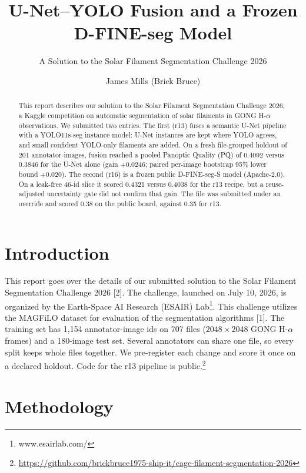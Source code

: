 \documentclass[sigconf,nonacm]{acmart}
\title{U-Net--YOLO Fusion and a Frozen D-FINE-seg Model}
\subtitle{A Solution to the Solar Filament Segmentation Challenge 2026}
\author{James Mills (Brick Bruce)}
\affiliation{%
  \institution{CAGE / Innovative Creative Solutions}
  \city{Port Allen}
  \state{Louisiana}
  \country{United States}
}
\begin{document}
\begin{abstract}
This report describes our solution to the Solar Filament Segmentation Challenge 2026, a Kaggle competition on automatic segmentation of solar filaments in GONG H-$\alpha$ observations.
We submitted two entries. The first (r13) fuses a semantic U-Net pipeline with a YOLO11s-seg instance model: U-Net instances are kept where YOLO agrees, and small confident YOLO-only filaments are added. On a fresh file-grouped holdout of 201 annotator-images, fusion reached a pooled Panoptic Quality (PQ) of 0.4092 versus 0.3846 for the U-Net alone (gain $+0.0246$; paired per-image bootstrap 95\% lower bound $+0.020$). The second (r16) is a frozen public D-FINE-seg-S model (Apache-2.0). On a leak-free 46-id slice it scored 0.4321 versus 0.4038 for the r13 recipe, but a reuse-adjusted uncertainty gate did not confirm that gain. The file was submitted under an override and scored 0.38 on the public board, against 0.35 for r13.
\end{abstract}

\maketitle


\section{Introduction}
This report goes over the details of our submitted solution to the Solar Filament Segmentation Challenge 2026 [2]. The challenge, launched on July 10, 2026, is organized by the Earth-Space AI Research (ESAIR) Lab\footnote{www.esairlab.com/}. This challenge utilizes the MAGFiLO dataset for evaluation of the segmentation algorithms [1].
The training set has 1,154 annotator-image ids on 707 files ($2048\times2048$ GONG H-$\alpha$ frames) and a 180-image test set. Several annotators can share one file, so every split keeps whole files together. We pre-register each change and score it once on a declared holdout. Code for the r13 pipeline is public.\footnote{\url{https://github.com/brickbruce1975-ship-it/cage-filament-segmentation-2026}}

\section{Methodology}
\end{document}
